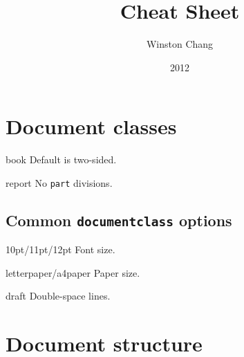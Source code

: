 \documentclass[10pt]{article}
\title{\LaTeXe Cheat Sheet}
\author{Winston Chang}
\date{2012}
\renewcommand{\maketitle}{%
{\begin{center}\Large \mythetitle\end{center}}
}
\begin{document}
\begin{multicols}{3}
\maketitle

\section{Document classes}

\begin{ttdesc}[labelwidth=\widthof{\texttt{report}}]
\item[book] Default is two-sided.
\item[report] No \texttt{part} divisions.
\end{ttdesc}

\subsection{Common \texttt{documentclass} options}

\begin{ttdesc}[labelwidth=\widthof{\ttfamily{letterpaper/a4paper}}]
\item[10pt/11pt/12pt] Font size.
\item[letterpaper/a4paper] Paper size.
\item[draft] Double-space lines.
\end{ttdesc}

\section{Document structure}

\vspace{-\baselineskip}


\end{multicols}
\end{document}
